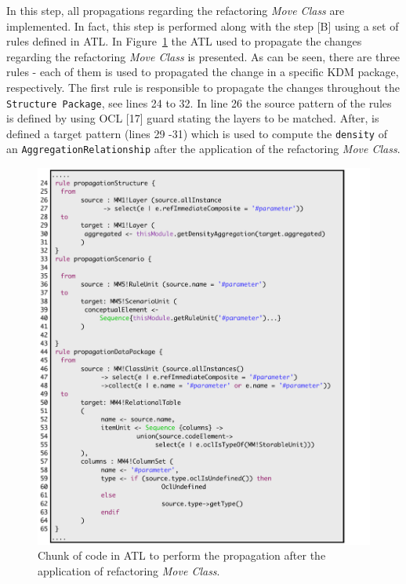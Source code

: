 In this step, all propagations regarding the refactoring \textit{Move Class} are implemented. In fact, this step is performed along with the step [B] using a set of rules defined in ATL. In Figure~\ref{fig:ATLPropagation} the ATL used to propagate the changes regarding the refactoring \textit{Move Class} is presented. As can be seen, there are three rules - each of them is used to propagated the change in a specific KDM package, respectively. The first rule is responsible to propagate the changes throughout the \texttt{Structure Package}, see lines 24 to 32. In line 26 the source pattern of the rules is defined by using OCL [17] guard stating the layers to be matched. After, is defined a target pattern (lines 29 -31) which is used to compute the \texttt{density} of an \texttt{AggregationRelationship} after the application of the refactoring \textit{Move Class}.

\begin{figure}[h]	
	\centering
	\includegraphics[scale=0.47]{figuras/propagationATLFormatted}
	\caption{Chunk of code in ATL to perform the propagation after the application of refactoring \textit{Move Class}.}
	\label{fig:ATLPropagation}
\end{figure}

